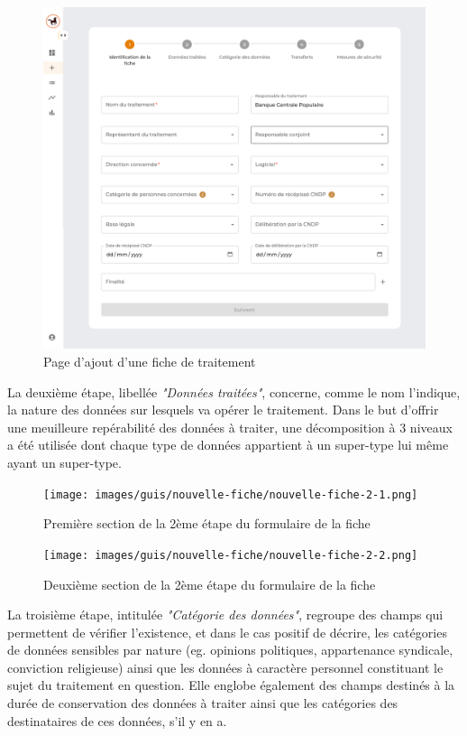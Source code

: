 \begin{figure}[H]
    \centering
    \includegraphics[width=\textwidth]{images/guis/nouvelle-fiche/nouvelle-fiche-1.png}
    \caption{Page d'ajout d'une fiche de traitement}
\end{figure}

\clearpage

\noindent La deuxième étape, libellée \textit{"Données traitées"}, concerne, comme le nom l'indique, la nature des données sur lesquels va opérer le traitement. Dans le but d'offrir une meuilleure repérabilité des données à traiter, une décomposition à 3 niveaux a été utilisée dont chaque type de données appartient à un super-type lui même ayant un super-type.

\begin{figure}[H]
    \centering
    \texttt{[image: images/guis/nouvelle-fiche/nouvelle-fiche-2-1.png]} 
    \caption{Première section de la 2ème étape du formulaire de la fiche}
\end{figure}

\begin{figure}[H]
    \centering
    \texttt{[image: images/guis/nouvelle-fiche/nouvelle-fiche-2-2.png]} 
    \caption{Deuxième section de la 2ème étape du formulaire de la fiche}
\end{figure}

\clearpage

\noindent La troisième étape, intitulée \textit{"Catégorie des données"}, regroupe des champs qui permettent de vérifier l'existence, et dans le cas positif de décrire, les catégories de données sensibles par nature (eg. opinions politiques, appartenance syndicale, conviction religieuse) ainsi que les données à caractère personnel constituant le sujet du traitement en question. Elle englobe également des champs destinés à la durée de conservation des données à traiter ainsi que les catégories des destinataires de ces données, s'il y en a. \\

